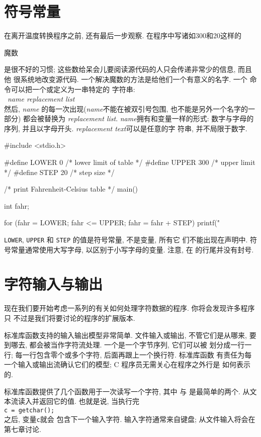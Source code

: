 \section{符号常量}
在离开温度转换程序之前, 还有最后一步观察. 在程序中写诸如300和20这样的 
\begin{myquotation}魔数\end{myquotation}
是很不好的习惯; 这些数给呆会儿要阅读源代码的人只会传递非常少的信息, 而且他
很系统地改变源代码. 一个解决魔数的方法是给他们一个有意义的名字. 一个 
\cdefine 命令可以把一个或定义为一串特定的
字符串: \\ \cdefine \ \textit{name replacement list} \\ 然后, \textit{name}
的每一次出现(\textit{name}不能在被双引号包围, 也不能是另外一个名字的一部分)
都会被替换为 \textit{replacement list}. \textit{name}拥有和变量一样的形式:
数字与字母的序列, 并且以字母开头. \textit{replacement text}可以是任意的字
符串, 并不局限于数字.
\begin{myverbatim}
    #include <stdio.h>

    #define LOWER 0     /* lower limit of table */
    #define UPPER 300   /* upper limit */
    #define STEP  20    /* step size */

    /* print Fahrenheit-Celsius table */
    main()
    {
        int fahr;

        for (fahr = LOWER; fahr <= UPPER; fahr = fahr + STEP)
            printf("%
    }
\end{myverbatim}
\verb"LOWER", \verb"UPPER" 和 \verb"STEP" 的值是符号常量, 不是变量, 所有它
们不能出现在声明中. 符号常量通常使用大写字母, 以区别于小写字母的变量. 注意,
在 \cdefine 的行尾并没有封号.

\section{字符输入与输出}
现在我们要开始考虑一系列的有关如何处理字符数据的程序. 你将会发现许多程序只
不过是我们将要讨论的程序的扩展版本.

标准库函数支持的输入输出模型非常简单. 文件输入或输出, 不管它们是从哪来, 要
到哪去, 都会被当作字符流处理. 一个是一个字节序列, 它们可以被
划分成一行一行; 每一行包含零个或多个字符, 后面再跟上一个换行符. 标准库函数 
有责任为每一个输入或输出流确认它们的模型; C 程序员无需关心在程序之外行是
如何表示的.

标准库函数提供了几个函数用于一次读写一个字符, 其中 \cgetchar 与 \cputchar 
是最简单的两个. \cgetchar 从文本流读入并返回它的值.
也就是说, 当执行完 \\ \verb"c = getchar();" \\ 之后, 变量\texttt{c}就会 
包含下一个输入字符. 输入字符通常来自键盘; 从文件输入将会在第七章讨论.

